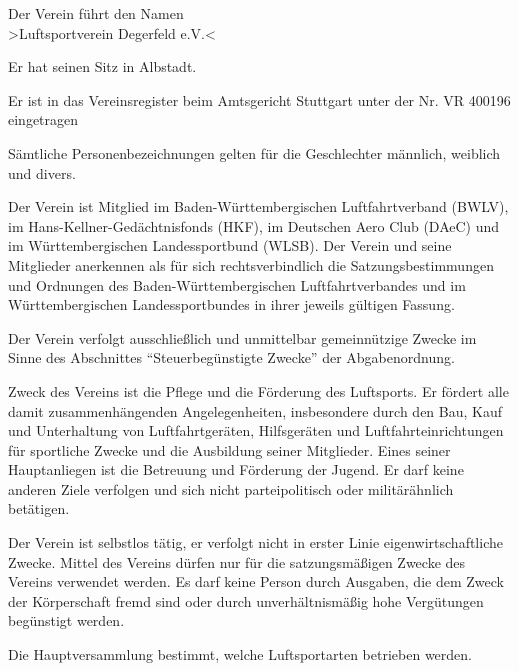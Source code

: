 \documentclass[10pt,a4paper,parskip=half]{scrartcl}
\begin{document}
\begin{contract}
    
    Der Verein führt den Namen\\
    >Luftsportverein Degerfeld e.V.<
    
    Er hat seinen Sitz in Albstadt.
    
    Er ist in das Vereinsregister beim Amtsgericht Stuttgart unter der Nr. VR 400196 eingetragen

    Sämtliche Personenbezeichnungen gelten für die Geschlechter männlich, weiblich und divers.
    
    Der Verein ist Mitglied im Ba\-den-Würt\-tem\-ber\-gischen Luftfahrt\-verband (BWLV),
    im Hans-Kellner-Gedächtnis\-fonds (HKF),
    im Deutschen Aero Club (DAeC) und im Würt\-tem\-ber\-gischen Landessportbund (WLSB).
    Der Verein und seine Mitglieder anerkennen als für sich rechtsverbindlich die Satzungsbestimmungen und Ordnungen des Baden-Württembergischen Luftfahrt\-verbandes und im Würt\-tem\-ber\-gischen Landes\-sport\-bundes in ihrer jeweils gültigen Fassung.
    
    Der Verein verfolgt ausschließlich und unmittelbar gemeinnützige Zwecke im Sinne des Abschnittes "`Steuerbegünstigte Zwecke"' der Abgabenordnung.
    
    Zweck des Vereins ist die Pflege und die Förderung des Luftsports.
    Er fördert alle damit zusammenhängenden Angelegenheiten,
    insbesondere durch den Bau,
    Kauf und Unterhaltung von Luftfahrtgeräten,
    Hilfsgeräten und Luftfahrteinrichtungen für sportliche Zwecke und die Ausbildung seiner Mitglieder.
    Eines seiner Hauptanliegen ist die Betreuung und Förderung der Jugend.
    Er darf keine anderen Ziele verfolgen und sich nicht parteipolitisch oder militärähnlich betätigen.
    
    Der Verein ist selbstlos tätig,
    er verfolgt nicht in erster Linie eigenwirtschaftliche Zwecke.
    Mittel des Vereins dürfen nur für die satzungsmäßigen Zwecke des Vereins verwendet werden.
    Es darf keine Person durch Ausgaben,
    die dem Zweck der Körperschaft fremd sind oder durch unverhältnismäßig hohe Vergütungen begünstigt werden.
    
    Die Hauptversammlung bestimmt,
    welche Luftsportarten betrieben werden.
    

\end{contract}
\end{document}
